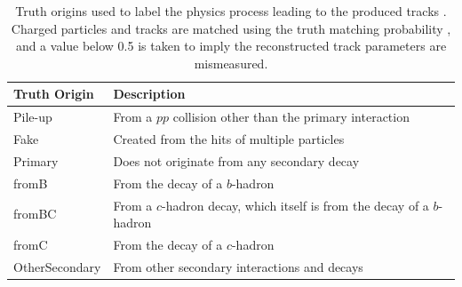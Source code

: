 \begin{table}[h]
  \begin{center}
      \begin{tabular}{ll} 
      	 \hline \hline
          Truth Origin & Description \\ \hline
          Pile-up           & From a $pp$ collision other than the primary interaction   \\
          Fake             & Created from the hits of multiple particles  \\
          Primary          & Does not originate from any secondary decay  \\
          fromB            & From the decay of a $b$-hadron  \\
          fromBC           & From a $c$-hadron decay, which itself is from the decay of a $b$-hadron   \\
          fromC            & From the decay of a $c$-hadron \\
          OtherSecondary   & From other secondary interactions and decays  \\ \hline \hline
      \end{tabular}
    \caption{Truth origins used to label the physics process leading to the produced tracks \cite{ATL-PHYS-PUB-2022-027}. Charged particles and tracks are matched using the truth matching probability \cite{ATLAS-tracks-algo}, and a value below 0.5 is taken to imply the reconstructed track parameters are mismeasured.}
    \label{tab:gnTrackOrigin}
  \end{center}
\end{table}

